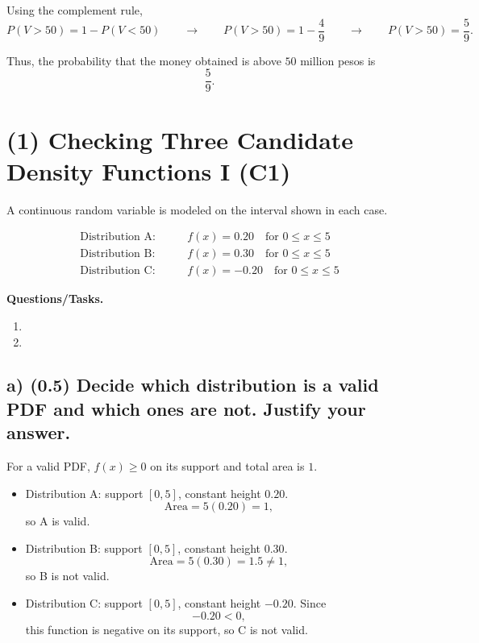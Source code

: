Using the complement rule,
\[
P(V>50)=1-P(V<50)\qquad \longrightarrow \qquad P(V>50)=1-\frac{4}{9}\qquad \longrightarrow \qquad P(V>50)=\frac{5}{9}.
\]

Thus, the probability that the money obtained is above $50$ million pesos is
\[
\frac{5}{9}.
\]


\section{(1) Checking Three Candidate Density Functions I (C1)}
\label{sec:checking-three-candidate-density-functions-i-c1}

A continuous random variable is modeled on the interval shown in each case.

\[
\begin{aligned}
	\text{Distribution A:} & \qquad f(x)=0.20 \quad \text{for } 0\le x\le 5 \\[0.3em]
	\text{Distribution B:} & \qquad  f(x)=0.30 \quad \text{for } 0\le x\le 5 \\[0.3em]
	\text{Distribution C:} & \qquad  f(x)=-0.20 \quad \text{for } 0\le x\le 5
\end{aligned}
\]

\textbf{Questions/Tasks.}
\begin{enumerate}[label=\textbf{\alph*)}]
	\item {}
	\item {}
\end{enumerate}


\subsection*{a) \textbf{(0.5)} Decide which distribution is a valid PDF and which ones are not. Justify your answer.}
\label{subsec:checking-three-candidate-density-functions-i-c1-a}
For a valid PDF, $f(x)\ge 0$ on its support and total area is $1$.
\begin{itemize}
	\item Distribution A: support $[0,5]$, constant height $0.20$.
	\[
	\text{Area}=5(0.20)=1,
	\]
	so A is valid.
	\item Distribution B: support $[0,5]$, constant height $0.30$.
	\[
	\text{Area}=5(0.30)=1.5\ne 1,
	\]
	so B is not valid.
	\item Distribution C: support $[0,5]$, constant height $-0.20$.
	Since
	\[
	-0.20<0,
	\]
	this function is negative on its support, so C is not valid.
\end{itemize}

